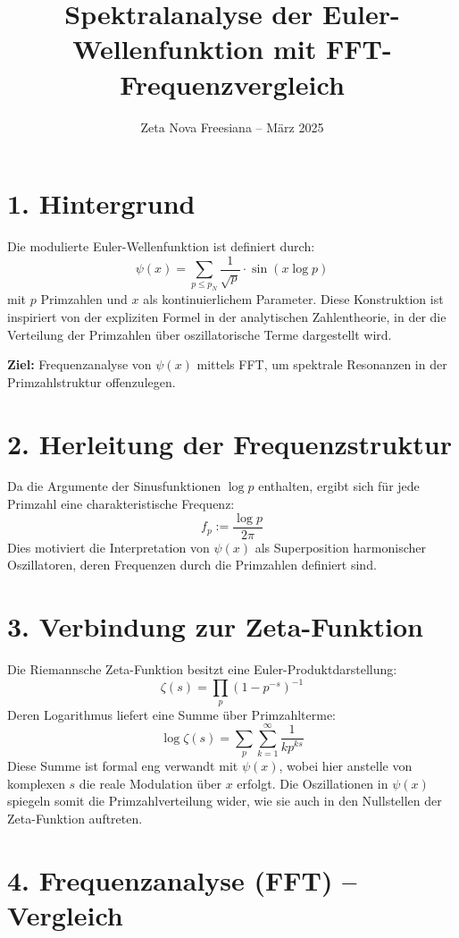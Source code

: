 \documentclass[12pt]{article}
\title{Spektralanalyse der Euler-Wellenfunktion mit FFT-Frequenzvergleich}
\author{Zeta Nova Freesiana – März 2025}
\date{}
\begin{document}
\maketitle

\section*{1. Hintergrund}

Die modulierte Euler-Wellenfunktion ist definiert durch:
\[
\psi(x) = \sum_{p \leq p_N} \frac{1}{\sqrt{p}} \cdot \sin(x \log p)
\]
mit \(p\) Primzahlen und \(x\) als kontinuierlichem Parameter. Diese Konstruktion ist inspiriert von der expliziten Formel in der analytischen Zahlentheorie, in der die Verteilung der Primzahlen über oszillatorische Terme dargestellt wird.

\textbf{Ziel:} Frequenzanalyse von \(\psi(x)\) mittels FFT, um spektrale Resonanzen in der Primzahlstruktur offenzulegen.

\section*{2. Herleitung der Frequenzstruktur}

Da die Argumente der Sinusfunktionen \(\log p\) enthalten, ergibt sich für jede Primzahl eine charakteristische Frequenz:
\[
f_p := \frac{\log p}{2\pi}
\]
Dies motiviert die Interpretation von \(\psi(x)\) als Superposition harmonischer Oszillatoren, deren Frequenzen durch die Primzahlen definiert sind.

\section*{3. Verbindung zur Zeta-Funktion}

Die Riemannsche Zeta-Funktion besitzt eine Euler-Produktdarstellung:
\[
\zeta(s) = \prod_{p} \left(1 - p^{-s}\right)^{-1}
\]
Deren Logarithmus liefert eine Summe über Primzahlterme:
\[
\log \zeta(s) = \sum_{p} \sum_{k=1}^\infty \frac{1}{k p^{ks}}
\]
Diese Summe ist formal eng verwandt mit \(\psi(x)\), wobei hier anstelle von komplexen \(s\) die reale Modulation über \(x\) erfolgt. Die Oszillationen in \(\psi(x)\) spiegeln somit die Primzahlverteilung wider, wie sie auch in den Nullstellen der Zeta-Funktion auftreten.

\section*{4. Frequenzanalyse (FFT) – Vergleich}
\end{document}
